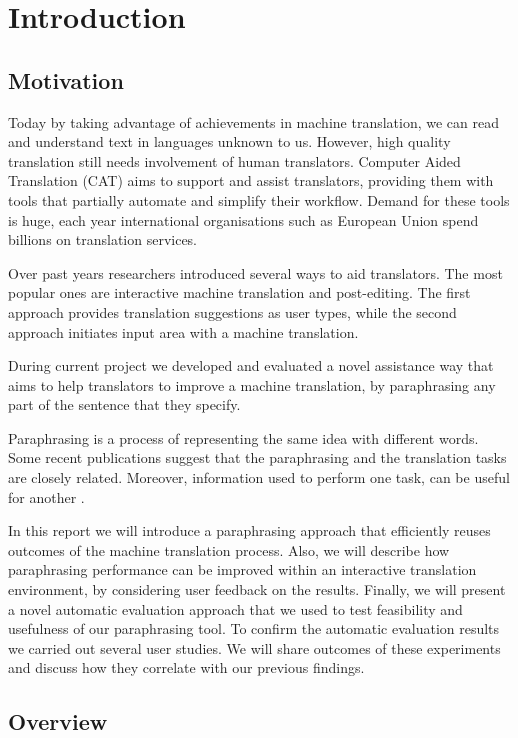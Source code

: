 \chapter{Introduction}
  
\section{Motivation}

Today by taking advantage of achievements in machine translation, we can read and understand text in languages unknown to us. However, high quality translation still needs involvement of human translators. Computer Aided Translation (CAT) aims to support and assist translators, providing them with tools that partially automate and simplify their workflow. Demand for these tools is huge, each year international organisations such as European Union spend billions on translation services. 

Over past years researchers introduced several ways to aid translators. The most popular ones are interactive machine translation and post-editing. The first approach provides translation suggestions as user types, while the second approach initiates input area with a machine translation. 

During current project we developed and evaluated a novel assistance way that aims to help translators to improve a machine translation, by paraphrasing any part of the sentence that they specify.

Paraphrasing is a process of representing the same idea with different words. Some recent publications suggest that the paraphrasing and the translation tasks are closely related. Moreover, information used to perform one task, can be useful for another \citep{Callison-Burch2007}. 

In this report we will introduce a paraphrasing approach that efficiently reuses outcomes of the machine translation process. Also, we will describe how paraphrasing performance can be improved within an interactive translation environment, by considering user feedback on the results. Finally, we will present a novel automatic evaluation approach that we used to test feasibility and usefulness of our paraphrasing tool. To confirm the automatic evaluation results we carried out several user studies. We will share outcomes of these experiments and discuss how they correlate with our previous findings. 

\section{Overview}

